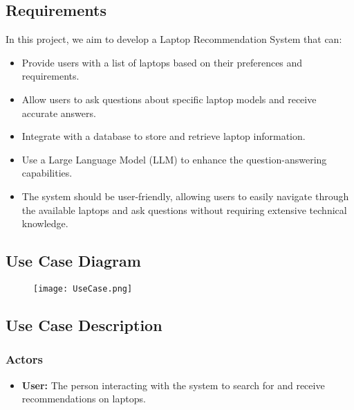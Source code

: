 \documentclass{article}
\begin{document}
\subsection{Requirements}
In this project, we aim to develop a Laptop Recommendation System that can:
\begin{itemize}
    \item Provide users with a list of laptops based on their preferences and requirements.
    \item Allow users to ask questions about specific laptop models and receive accurate answers.
    \item Integrate with a database to store and retrieve laptop information.
    \item Use a Large Language Model (LLM) to enhance the question-answering capabilities.
    \item The system should be user-friendly, allowing users to easily navigate through the available laptops and ask questions without requiring extensive technical knowledge.
\end{itemize}

\subsection{Use Case Diagram}
\noindent
\begin{figure}[h!]
    \centering
    \texttt{[image: UseCase.png]} %
\end{figure}

\subsection{Use Case Description}
\subsubsection{Actors}
\begin{itemize}
    \item \textbf{User:} The person interacting with the system to search for and receive recommendations on laptops.
\end{itemize}
\end{document}
